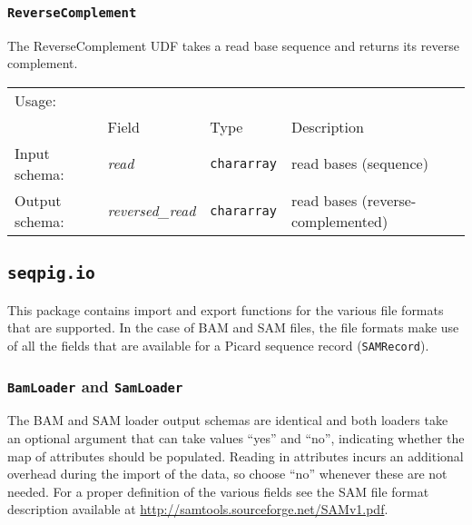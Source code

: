 \subsubsection{\texttt{ReverseComplement}}

The ReverseComplement UDF takes a read base sequence and returns its
reverse complement.

\begin{tabular}{lp{}p{}p{}}
Usage: & \multicolumn{3}{l}{}
\hspace*{-0.55cm}\begin{minipage}{0.9\textwidth}
  \begin{lstlisting}
  reads = load 'input.fq' using FastqLoader();
  reversed_reads = FOREACH reads GENERATE ReverseComplement(sequence);
  \end{lstlisting}
  \end{minipage}\hfill\kern-\arrayrulewidth
 \\[0.25cm]
& Field & Type & Description\\[0.1cm]
Input schema: & \emph{read} & \texttt{chararray} & read bases (sequence)\\
Output schema: & \emph{reversed\_read} & \texttt{chararray} & read bases (reverse-complemented)\\
\end{tabular} 

\subsection{\texttt{seqpig.io}}

This package contains import and export functions for the various file
formats that are supported. In the case of BAM and SAM files, the file
formats make use of all the fields that are available for a Picard
sequence record (\texttt{SAMRecord}).

\subsubsection{\texttt{BamLoader} and \texttt{SamLoader}}

The BAM and SAM loader output schemas are identical and both loaders
take an optional argument that can take values ``yes'' and ``no'',
indicating whether the map of attributes should be populated. Reading
in attributes incurs an additional overhead during the import of the
data, so choose ``no'' whenever these are not needed. For a proper
definition of the various fields see the SAM file format description
available at \url{http://samtools.sourceforge.net/SAMv1.pdf}.

